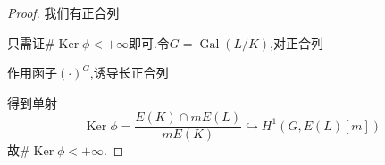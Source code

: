 \documentclass[12pt,A4paper,oneside,reqno]{amsart}
\numberwithin{equation}{section}
\theoremstyle{definition}
\theoremstyle{plain}
\theoremstyle{plain}
\numberwithin{equation}{section}
\theoremstyle{remark}
\DeclareMathOperator{\Ker}{\operatorname{Ker}}
\newcommand{\Hom}{\operatorname{Hom}}
\newcommand{\Gal}{\operatorname{Gal}}
\newcommand{\Set}{\operatorname{\textbf{Set}}}
\begin{document}
\begin{proof}
	我们有正合列
	\begin{center}
	\end{center}

只需证$\#\Ker \phi < + \infty$即可.令$G=\Gal(L/K)$,对正合列
	\begin{center}
	\end{center}
作用函子$(\cdot)^G$,诱导长正合列
	\begin{center}
	\end{center}
得到单射
$$\Ker \phi=\frac{E(K) \cap mE(L)}{mE(K)} \hookrightarrow H^1(G,E(L)[m])$$
故$\#\Ker \phi < + \infty$.
\iffalse%
对每一个$\bar{P} \in \Ker \phi$(后省略代表元符号),设$P=nQ$, $Q \in E(L)$,我们指定一个良定映射(与$Q$相关)
$$\lambda_P: \Gal (L/K) \longrightarrow E(L)[m] \qquad \sigma \longmapsto \sigma(Q)-Q$$
于是我们得到一个非自然的映射:
$$\Phi \longrightarrow \Hom_{\Set}(\Gal (L/K), E(L)[m]) \qquad P \longmapsto \lambda_P$$
可以验证$\Phi$为单射:
\begin{equation*}
\begin{aligned}
\Phi(P)=\Phi(P') \Longrightarrow&\; \sigma(Q)-Q=\sigma(Q')-Q' \quad\text{ for any } \sigma \in \Gal(L/K)\\
\Longrightarrow&\;\sigma(Q-Q')=Q-Q'\quad\text{ for any } \sigma \in \Gal(L/K)\\
\Longrightarrow&\;Q-Q' \in E(K)\\
\Longrightarrow&\;P-P'=m(Q-Q')=0 \quad{ in } \;\Ker \phi\\
\end{aligned}
\end{equation*}
故$\#\Ker \phi < + \infty$.
\fi%
\end{proof}
\end{document}
